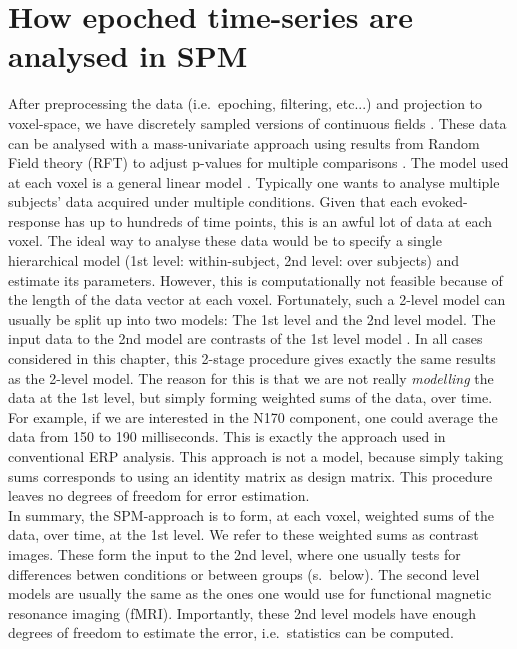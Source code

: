 \section{How epoched time-series are analysed in SPM}
After preprocessing the data (i.e.~epoching, filtering, etc...) and
projection to voxel-space, we have discretely sampled versions of
continuous fields \cite{kiebel_spm_eeg1}. These data can be analysed
with a mass-univariate approach using results from Random Field theory
(RFT) to adjust p-values for multiple comparisons \cite{kjw_hbf2}. The
model used at each voxel is a general linear model
\cite{kiebel_spm_eeg2}. Typically one wants to analyse
multiple subjects' data acquired under multiple conditions. Given that
each evoked-response has up to hundreds of time points, this is an
awful lot of data at each voxel. The ideal way to analyse these data
would be to specify a single hierarchical model (1st level: within-subject,
2nd level: over subjects) and estimate its parameters. However, this
is computationally not feasible because of the length of the data
vector at each voxel. Fortunately, such a 2-level model can usually be
split up into two models: The 1st level and the 2nd level model. The
input data to the 2nd model are contrasts of the 1st level model
\cite{kiebel_spm_eeg2}. In all cases considered in this chapter, this
2-stage procedure 
gives exactly the same results as the 2-level model. The reason for
this is that we are not really \textit{modelling} the data at the 1st
level, but simply forming weighted sums of the data, over time. For
example, if we are interested in the N170 component, one could average
the data from 150 to 190 milliseconds. This is exactly the approach
used in conventional ERP analysis. This approach is not a model,
because simply taking sums corresponds to using an identity matrix as
design matrix. This procedure leaves no degrees of freedom for error
estimation.\\

In summary, the SPM-approach is to form, at each voxel, weighted sums of
the data, over time, at the 1st level. We refer to these weighted sums
as contrast images. These form the input to the 2nd level, where
one usually tests for differences betwen conditions or between groups
(s.~below). The second level models are usually the same as the ones
one would use for functional magnetic resonance imaging (fMRI). Importantly,
these 2nd level models have enough degrees of freedom to estimate the
error, i.e.~statistics can be computed.\\

